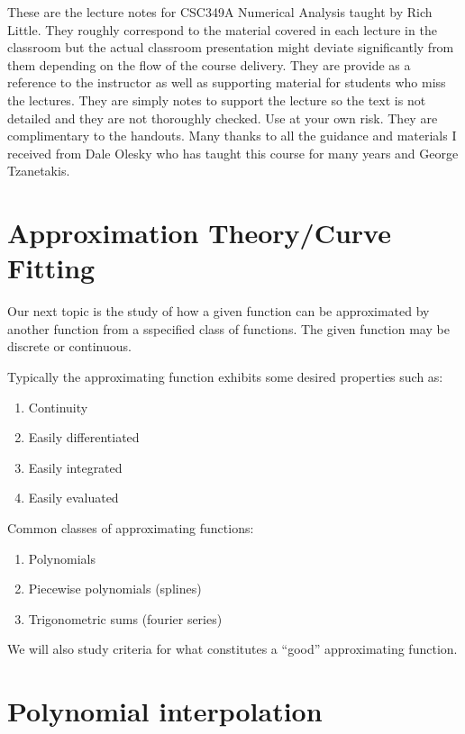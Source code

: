 \documentclass [titlepage,12pt,letter] {article}
\begin{document}
 


These are the lecture notes for CSC349A Numerical Analysis taught by
Rich Little. They roughly correspond to
the material covered in each lecture in the classroom but the actual
classroom presentation might deviate significantly from them depending
on the flow of the course delivery. They are provide as a reference to
the instructor as well as supporting material for students who miss
the lectures. They are simply notes to support the lecture so the text
is not detailed and they are not thoroughly checked. Use at your own
risk. They are complimentary to the handouts. Many thanks to all the
guidance and materials I received from Dale Olesky who has taught this
course for many years and George Tzanetakis.


\section{Approximation Theory/Curve Fitting} 

Our next topic is the study of how a given function can be approximated by another function 
from a sspecified class of functions. The given function may be discrete or continuous. 

Typically the approximating function exhibits some desired properties such as: 

\begin{enumerate} 
\item{Continuity} 
\item{Easily differentiated} 
\item{Easily integrated} 
\item{Easily evaluated} 
\end{enumerate}

Common classes of approximating functions: 
\begin{enumerate} 
\item{Polynomials} 
\item{Piecewise polynomials (splines)}
\item{Trigonometric sums (fourier series)}
\end{enumerate} 

We will also study criteria for what constitutes a ``good'' approximating function. 

\section{Polynomial interpolation} 
\end{document}
